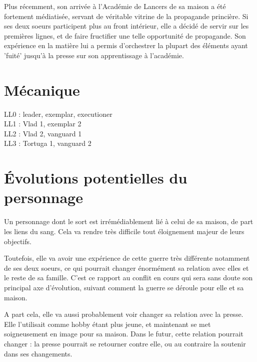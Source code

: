 \documentclass[10pt,a4paper]{article}
\begin{document}
Plus récemment, son arrivée à l'Académie de Lancers de sa maison a été fortement médiatisée, servant de véritable vitrine de la propagande princière. Si ses deux soeurs participent plus au front intérieur, elle a décidé de servir sur les premières lignes, et de faire fructifier une telle opportunité de propagande. Son expérience en la matière lui a permis d'orchestrer la plupart des éléments ayant 'fuité' jusqu'à la presse sur son apprentissage à l'académie.
\section{Mécanique}
LL0 : leader, exemplar, executioner\\
LL1 : Vlad 1, exemplar 2 \\
LL2 : Vlad 2, vanguard 1\\
LL3 : Tortuga 1, vanguard 2

\section{Évolutions potentielles du personnage}
Un personnage dont le sort est irrémédiablement lié à celui de sa maison, de part les liens du sang. Cela va rendre très difficile tout éloignement majeur de leurs objectifs.

Toutefois, elle va avoir une expérience de cette guerre très différente notamment de ses deux soeurs, ce qui pourrait changer énormément sa relation avec elles et le reste de sa famille. C'est ce rapport au conflit en cours qui sera sans doute son principal axe d'évolution, suivant comment la guerre se déroule pour elle et sa maison.

A part cela, elle va aussi probablement voir changer sa relation avec la presse. Elle l'utilisait comme hobby étant plus jeune, et maintenant se met soigneusement en image pour sa maison. Dans le futur, cette relation pourrait changer : la presse pourrait se retourner contre elle, ou au contraire la soutenir dans ses changements.
\end{document}
